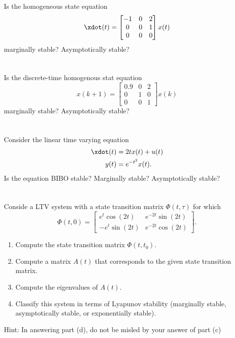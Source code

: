 \documentclass[10pt]{article}
\begin{document}
\section{}
Is the homogeneous state equation 
\begin{equation*}
  \xdot (t)  =
  \begin{bmatrix}
    -1 & 0 & 2\\ 0 & 0 & 1 \\ 0 & 0 & 0
  \end{bmatrix}x(t)
\end{equation*}
marginally stable? Asymptotically stable?


\section{}
Is the discrete-time homogenous stat equation
\begin{equation}
  x(k+1) =
  \begin{bmatrix}
    0.9 & 0 & 2\\ 0 & 1 & 0\\ 0 & 0 & 1
  \end{bmatrix}x(k)
\end{equation}
marginally stable? Asymptotically stable?


\section{}
Consider the linear time varying equation
\begin{equation}
  \begin{split}
    \xdot(t) &= 2tx(t) + u(t) \\
    y(t) &= e^{-t^2}x(t).
  \end{split}
\end{equation}
Is the equation BIBO stable? Marginally stable? Asymptotically stable?

\section{}
Conside a LTV system with a state transition matrix $\Phi(t,\tau)$ for
which 
\begin{equation*}
  \Phi(t,0) =
  \begin{bmatrix}
    e^t\cos(2t) & e^{-2t}\sin(2t) \\ 
    -e^{t}\sin(2t) & e^{-2t}\cos(2t)
  \end{bmatrix}.
\end{equation*}
\begin{enumerate}[label=(\alph*)]
\item Compute the state transition matrix $\Phi(t,t_0)$.
\item Compute a matrix $A(t)$ that corresponds to the given state
  transition matrix.
\item Compute the eigenvalues of $A(t)$.
\item Classify this system in terms of Lyapunov stability (marginally
  stable, asymptotically stable, or exponentially stable).
\end{enumerate}

Hint: In answering part (d), do not be misled by your answer of part (c)
% 
% 
\end{document}
